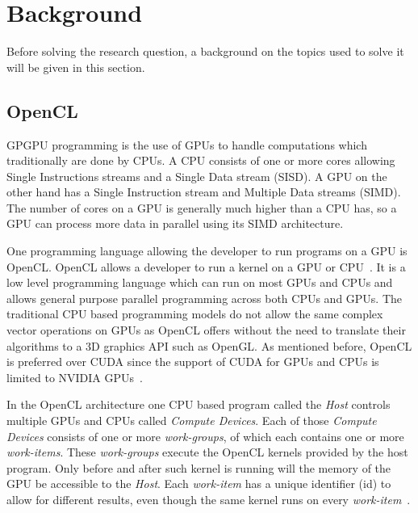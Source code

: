 \section{Background}
Before solving the research question, a background on the topics used to solve it will be given in this section.

\subsection{OpenCL}
GPGPU programming is the use of GPUs to handle computations which traditionally are done by CPUs.
A CPU consists of one or more cores allowing Single Instructions streams and a Single Data stream (SISD).
A GPU on the other hand has a Single Instruction stream and Multiple Data streams (SIMD).
The number of cores on a GPU is generally much higher than a CPU has, so a GPU can process more data in parallel using its SIMD architecture.

One programming language allowing the developer to run programs on a GPU is OpenCL.
OpenCL allows a developer to run a kernel on a GPU or CPU~\cite{OpenCL}.
It is a low level programming language which can run on most GPUs and CPUs and allows general purpose parallel programming across both CPUs and GPUs.
The traditional CPU based programming models do not allow the same complex vector operations on GPUs as OpenCL offers without the need to translate their algorithms to a 3D graphics API such as OpenGL.
As mentioned before, OpenCL is preferred over CUDA since the support of CUDA for GPUs and CPUs is limited to NVIDIA GPUs~\cite{CUDA}.

In the OpenCL architecture one CPU based program call\-ed the \textit{Host} controls multiple GPUs and CPUs called \textit{Compute Devices}.
Each of those \textit{Compute Devices} consists of one or more \textit{work-groups}, of which each contains one or more \textit{work-items}.
These \textit{work-groups} execute the OpenCL kernels provided by the host program.
Only before and after such kernel is running will the memory of the GPU be accessible to the \textit{Host}.
Each \textit{work-item} has a unique identifier (id) to allow for different results, even though the same kernel runs on every \textit{work-item}~\cite{OpenCL}.

\begin{comment}
The memory hierarchy used in OpenCL is not equal to that of the physical memory configuration on GPUs.
This is to prevent having to take into account every type of architecture, which would be tedious work as the amount of types is quite large.
Each of the architectural devices discussed above have their own memory, which is inaccessible to components of the same type.
Every processing element can access its own private memory, the memory of its compute unit, the memory of its compute device.
The host memory can be accessed, but it is generally slower than the on-board memory~\cite{OpenCL}.

The architecture and memory hierarchy already enforce the division of the algorithm if one wants to use every component of a GPU.
\end{comment}

